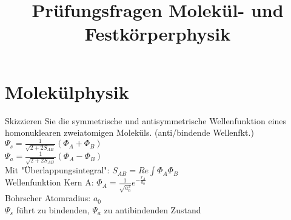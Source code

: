 \documentclass[a5paper,12pt,ngerman,print,grid=front]{kartei}
\title{Prüfungsfragen Molekül- und Festkörperphysik}
\begin{document}
\section*{Molekülphysik}



	\begin{karte}{
    	Skizzieren Sie die symmetrische und antisymmetrische Wellenfunktion eines 
        homonuklearen zweiatomigen Moleküls. (anti/bindende Wellenfkt.)
        }
		$\Psi_s=\frac{1}{\sqrt{2+2S_{AB}}}(\Phi_A+\Phi_B)$ \\
        
		$\Psi_a=\frac{1}{\sqrt{2+2S_{AB}}}(\Phi_A-\Phi_B)$ \\
        
		Mit "Überlappungsintegral": $S_{AB}=Re \int \Phi_A \Phi_B$ \\
        
		Wellenfunktion Kern A: $ \Phi_A= \frac{1}{\sqrt{a_0^3}}e^{-\frac{r_A}{a_0}}$ \\
        
        Bohrscher Atomradius: $a_0$ \\
        
        $\Psi_s$ führt zu bindenden, $\Psi_a$ zu antibindenden Zustand
        
    \end{karte}
\end{document}
